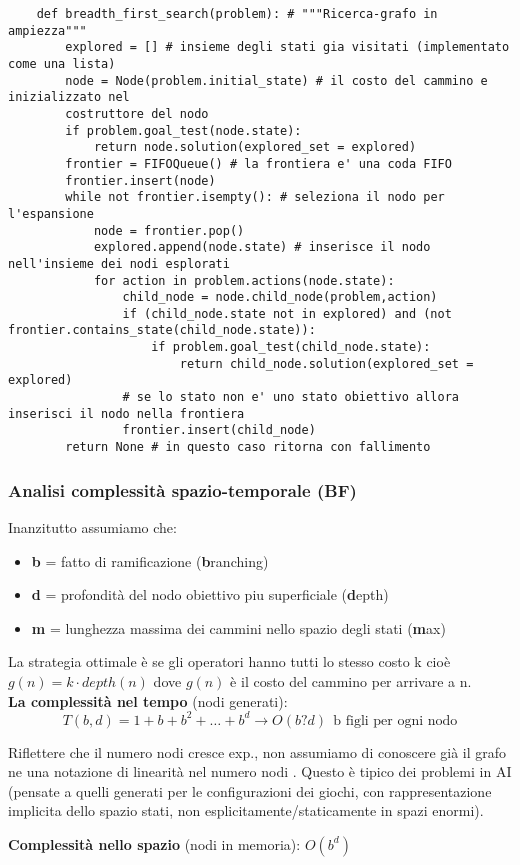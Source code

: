 \begin{lstlisting}
	def breadth_first_search(problem): # """Ricerca-grafo in ampiezza"""
		explored = [] # insieme degli stati gia visitati (implementato come una lista)
		node = Node(problem.initial_state) # il costo del cammino e inizializzato nel
		costruttore del nodo
		if problem.goal_test(node.state):
			return node.solution(explored_set = explored)
		frontier = FIFOQueue() # la frontiera e' una coda FIFO
		frontier.insert(node)
		while not frontier.isempty(): # seleziona il nodo per l'espansione
			node = frontier.pop()
			explored.append(node.state) # inserisce il nodo nell'insieme dei nodi esplorati
			for action in problem.actions(node.state):
				child_node = node.child_node(problem,action)
				if (child_node.state not in explored) and (not frontier.contains_state(child_node.state)):
					if problem.goal_test(child_node.state):
						return child_node.solution(explored_set = explored)
				# se lo stato non e' uno stato obiettivo allora inserisci il nodo nella frontiera
				frontier.insert(child_node)
		return None # in questo caso ritorna con fallimento
\end{lstlisting}

\subsubsection*{Analisi complessità spazio-temporale (BF)}
Inanzitutto assumiamo che:
\begin{itemize}
	\item \textbf{b} = fatto di ramificazione (\textbf{b}ranching)
	\item \textbf{d} = profondità del nodo obiettivo piu superficiale (\textbf{d}epth) 
	\item \textbf{m} = lunghezza massima dei cammini nello spazio degli stati (\textbf{m}ax)
\end{itemize}
La strategia ottimale è se gli operatori hanno tutti lo stesso costo k cioè $g(n) = k \cdot depth(n)$ dove $g(n)$ è il costo del 
cammino per arrivare a n.\\
\textbf{La complessità nel tempo} (nodi generati):
$$T(b, d) = 1 + b + b^2 + \dots + b^d \to O(b?d) \:\: \text{b figli per ogni nodo}$$
\begin{note}
	Riflettere che il numero nodi cresce exp., non assumiamo di conoscere già il
	grafo ne una notazione di linearità nel numero nodi . Questo è tipico dei problemi in
	AI (pensate a quelli generati per le configurazioni dei giochi, con rappresentazione
	implicita dello spazio stati, non esplicitamente/staticamente in spazi enormi).
\end{note}
\textbf{Complessità nello spazio} (nodi in memoria): $O(b^d)$

